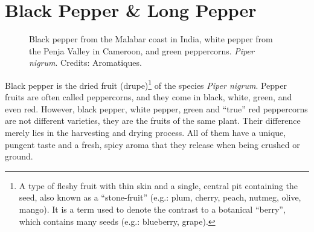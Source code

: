 \section{Black Pepper \& Long Pepper}
\label{sec:pepper}



\begin{figure}[!ht]
	\vspace{-4ex}
	\centering
	\hfill
	\hfill
	\caption[True peppers: black, white, and green.]{Black pepper from the Malabar coast in India, white pepper from the Penja Valley in Cameroon, and green peppercorns. \textit{Piper nigrum}. Credits: Aromatiques.}
	\label{fig:pepper_imgs}
\end{figure}

Black pepper is the dried fruit (drupe)\footnote{A type of fleshy fruit with thin skin and a single, central pit containing the seed, also known as a ``stone-fruit'' (e.g.: plum, cherry, peach, nutmeg, olive, mango). It is a term used to denote the contrast to a botanical ``berry'', which contains many seeds (e.g.: blueberry, grape).} of the species \textit{Piper nigrum}. Pepper fruits are often called peppercorns, and they come in black, white, green, and even red. However, black pepper, white pepper, green and ``true'' red peppercorns are not different varieties, they are the fruits of the same plant. Their difference merely lies in the harvesting and drying process. All of them have a unique, pungent taste and a fresh, spicy aroma that they release when being crushed or ground. 

